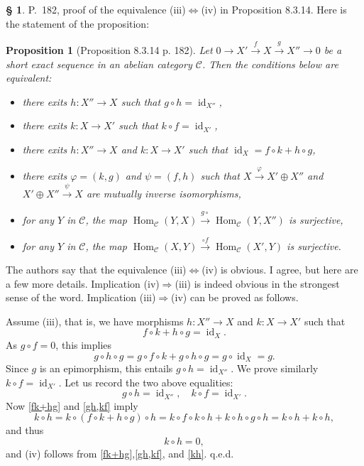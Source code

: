 \documentclass[12pt]{article}
\newtheorem{prop}[thm]{Proposition}
\theoremstyle{remark}
\theoremstyle{definition}
\newtheorem{s}[thm]{\S}
\newcommand{\C}{\mathcal C}
\newcommand{\pp}{\varphi}
\newcommand{\ssi}{\Leftrightarrow}
\newcommand{\then}{\Rightarrow}
\newcommand{\xr}{\xrightarrow}
\DeclareMathOperator{\id}{id}
\DeclareMathOperator{\Hom}{Hom}
\begin{document}
\begin{s} 
P.~182, proof of the equivalence (iii)$\ssi$(iv) in Proposition 8.3.14. Here is the statement of the proposition:

\begin{prop}[Proposition 8.3.14 p. 182] 
Let $0\to X'\xr fX\xr gX''\to0$ be a short exact sequence in an abelian category $\C$. Then the conditions below are equivalent:
\begin{itemize}
\item[\em(i)] there exits $h:X''\to X$ such that $g\circ h=\id_{X''}$,
\item[\em(ii)] there exits $k:X\to X'$ such that $k\circ f=\id_{X'}$,
\item[\em(iii)] there exits $h:X''\to X$ and $k:X\to X'$ such that $\id_X=f\circ k+h\circ g$,
\item[\em(iv)] there exits $\pp=(k,g)$ and $\psi=(f,h)$ such that $X\xr\pp X'\oplus X''$ and $X'\oplus X''\xr\psi X$ are mutually inverse isomorphisms,
\item[\em(v)] for any $Y$ in $\C$, the map $\Hom_\C(Y,X)\xr{g\circ}\Hom_\C(Y,X'')$ is surjective,
\item[\em(vi)] for any $Y$ in $\C$, the map $\Hom_\C(X,Y)\xr{\circ f}\Hom_\C(X',Y)$ is surjective.
\end{itemize}
\end{prop}

The authors say that the equivalence (iii)$\ssi$(iv) is obvious. I agree, but here are a few more details. Implication (iv)$\then$(iii) is indeed obvious in the strongest sense of the word. Implication (iii)$\then$(iv) can be proved as follows. 

Assume (iii), that is, we have morphisms $h:X''\to X$ and $k:X\to X'$ such that 
%
\begin{equation}\label{fk+hg} 
f\circ k+h\circ g=\id_X.
\end{equation} 
% 
As $g\circ f=0$, this implies 
$$
g\circ h\circ g=g\circ f\circ k+g\circ h\circ g=g\circ\id_X=g. 
$$ 
Since $g$ is an epimorphism, this entails $g\circ h=\id_{X''}$. We prove similarly $k\circ f=\id_{X'}$. Let us record the two above equalities: 
% 
\begin{equation}\label{gh,kf} 
g\circ h=\id_{X''},\quad k\circ f=\id_{X'}.
\end{equation} 
% 
Now \eqref{fk+hg} and \eqref{gh,kf} imply 
$$
k\circ h=k\circ(f\circ k+h\circ g)\circ h=k\circ f\circ k\circ h+k\circ h\circ g\circ h=k\circ h+k\circ h,
$$ 
and thus 
%
\begin{equation}\label{kh} 
k\circ h=0, 
\end{equation} 
% 
and (iv) follows from \eqref{fk+hg},\eqref{gh,kf}, and \eqref{kh}. q.e.d.
\end{s}
\end{document}
